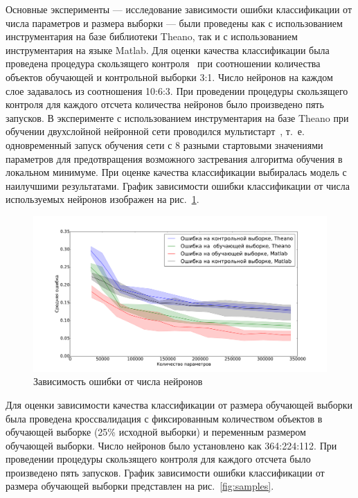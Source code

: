 \documentclass[12pt,notitlepage]{article}
\begin{document}
Основные эксперименты --- исследование зависимости ошибки классификации от числа параметров и размера выборки --- были проведены как с использованием инструментария на базе библиотеки Theano, так и с использованием инструментария на языке Matlab. 
Для оценки качества классификации была проведена процедура скользящего контроля~\cite{cv} при соотношении количества объектов обучающей и контрольной выборки 3:1. Число нейронов на каждом слое задавалось из соотношения 10:6:3. При проведении процедуры скользящего контроля для каждого отсчета количества нейронов было произведено пять запусков. В эксперименте с использованием инструментария на базе Theano при обучении двухслойной нейронной сети проводился мультистарт~\cite{multi}, т.~е. одновременный запуск обучения сети с 8 разными стартовыми значениями параметров для предотвращения возможного застревания алгоритма обучения в локальном минимуме. При оценке качества классификации выбиралась модель с наилучшими результатами. График зависимости ошибки классификации от числа используемых нейронов изображен на рис.~\ref{fig:neurons}.

\begin{figure}[tb!]
 \centering
  \includegraphics[width=1.0\textwidth]{neurons.pdf}
 \caption{Зависимость ошибки от числа нейронов}
 \label{fig:neurons}
\end{figure}


Для оценки зависимости качества классификации от размера обучающей выборки была проведена кроссвалидация с фиксированным количеством объектов в обучающей выборке (25\% исходной выборки) и переменным размером обучающей выборки. Число нейронов было установлено как 364:224:112. При проведении процедуры скользящего контроля для каждого отсчета было произведено пять запусков. График зависимости ошибки классификации от размера обучающей выборки представлен на рис.~\ref{fig:samples}.
\end{document}
